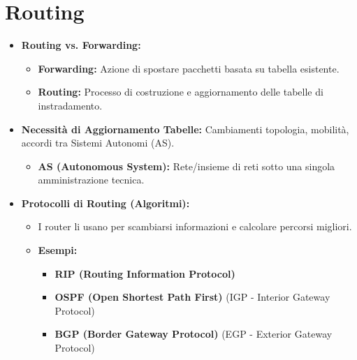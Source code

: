 \section{Routing}
\begin{itemize}
    \item \textbf{Routing vs. Forwarding:}
    \begin{itemize}
        \item \textbf{Forwarding:} Azione di spostare pacchetti basata su tabella esistente.
        \item \textbf{Routing:} Processo di costruzione e aggiornamento delle tabelle di instradamento.
    \end{itemize}
    \item \textbf{Necessità di Aggiornamento Tabelle:} Cambiamenti topologia, mobilità, accordi tra Sistemi Autonomi (AS).
    \begin{itemize}
        \item \textbf{AS (Autonomous System):} Rete/insieme di reti sotto una singola amministrazione tecnica.
    \end{itemize}
    \item \textbf{Protocolli di Routing (Algoritmi):}
    \begin{itemize}
        \item I router li usano per scambiarsi informazioni e calcolare percorsi migliori.
        \item \textbf{Esempi:}
        \begin{itemize}
            \item \textbf{RIP (Routing Information Protocol)}
            \item \textbf{OSPF (Open Shortest Path First)} (IGP - Interior Gateway Protocol)
            \item \textbf{BGP (Border Gateway Protocol)} (EGP - Exterior Gateway Protocol)
        \end{itemize}
    \end{itemize}
\end{itemize}

